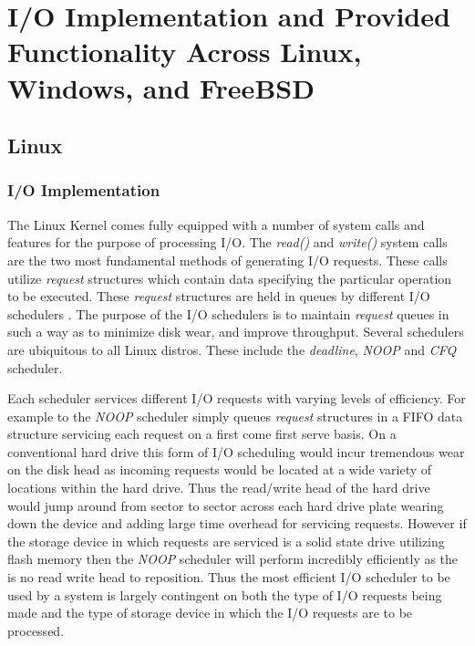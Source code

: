 \section{\bf I/O Implementation and Provided Functionality Across Linux, Windows, and FreeBSD}
\subsection{\bf Linux}
  \subsubsection{\bf I/O Implementation}
    \normalfont \indent The Linux Kernel comes fully equipped with a number of system calls and features for the purpose of processing I/O. The \textit{read()} and \textit{write()} system calls are the two most fundamental methods of generating I/O requests. These calls utilize \textit{request} structures which contain data specifying the particular operation to be executed. These \textit{request} structures are held in queues by different I/O schedulers \cite{LinuxPage}. The purpose of the I/O schedulers is to maintain \textit{request} queues in such a way as to minimize disk wear, and improve throughput. Several schedulers are ubiquitous to all Linux distros. These include the \textit{deadline}, \textit{NOOP} and \textit{CFQ} scheduler. 

	\normalfont \indent Each scheduler services different I/O requests with varying levels of efficiency. For example to the \textit{NOOP} scheduler simply queues \textit{request} structures in a FIFO data structure servicing each request on a first come first serve basis. On a conventional hard drive this form of I/O scheduling would incur tremendous wear on the disk head as incoming requests would be located at a wide variety of locations within the hard drive. Thus the read/write head of the hard drive would jump around from sector to sector across each hard drive plate wearing down the device and adding large time overhead for servicing requests. However if the storage device in which requests are serviced is a solid state drive utilizing flash memory then the \textit{NOOP} scheduler will perform incredibly efficiently as the is no read write head to reposition. Thus the most efficient I/O scheduler to be used by a system is largely contingent on both the type of I/O requests being made and the type of storage device in which the I/O requests are to be processed. \\

